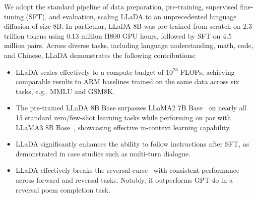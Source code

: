 \documentclass{article}
\newcommand{\cx}[1]{{\color{green}{[[\textbf{cx: }#1]]}}}
\begin{document}
We adopt the standard pipeline of data preparation, pre-training, supervised fine-tuning (SFT), and evaluation, scaling LLaDA to an unprecedented language diffusion of size 8B. In particular, LLaDA 8B was pre-trained from scratch on 2.3 trillion tokens using 0.13 million H800 GPU hours, followed by SFT on 4.5 million pairs. Across diverse tasks, including language understanding, math, code, and Chinese, LLaDA demonstrates the following contributions:
\begin{itemize}[leftmargin=*, itemsep=0pt]
    \item LLaDA scales effectively to a compute budget of $10^{23}$ FLOPs, achieving comparable results to ARM baselines trained on the same data across six tasks, e.g., MMLU and GSM8K.
    \item The pre-trained LLaDA 8B Base surpasses LLaMA2 7B Base~\citep{touvron2023llama2} on nearly all 15 standard zero/few-shot learning tasks while performing on par with LLaMA3 8B Base~\citep{dubey2024llama}, showcasing effective in-context learning capability.
    \item LLaDA significantly enhances the ability to follow instructions after SFT, as demonstrated in case studies such as multi-turn dialogue.
    \item LLaDA effectively breaks the reversal curse~\citep{berglund2023reversal} with consistent performance across forward and reversal tasks. Notably, it outperforms GPT-4o in a reversal poem completion task. 

\end{itemize}



\end{document}
